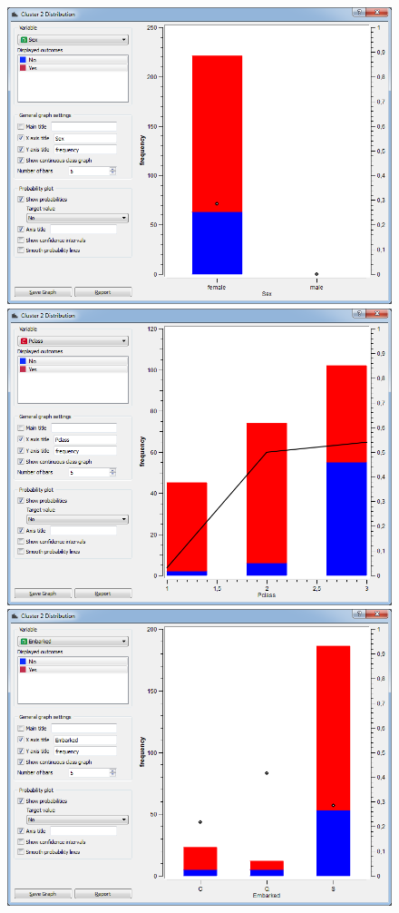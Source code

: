 \documentclass[a4paper,11pt]{article}
\begin{document}
\begin{figure}[h]
	\centering
	\begin{flushleft}
		\includegraphics[scale=0.30]{ClusterDistribution/Cluster2/Sex}
		\includegraphics[scale=0.30]{ClusterDistribution/Cluster2/PClass}\\
		\includegraphics[scale=0.30]{ClusterDistribution/Cluster2/Embarked}

\end{flushleft}
\end{figure}
\end{document}
